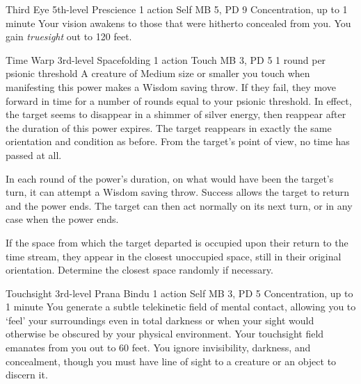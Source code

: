 \DndPowerHeader%
  {Third Eye}
  {5th-level Prescience}
  {1 action}
  {Self}
  {MB 5, PD 9}
  {Concentration, up to 1 minute}
Your vision awakens to those that were hitherto
concealed from you.
You gain \emph{truesight} out to 120 feet.

\DndPowerHeader%
  {Time Warp}
  {3rd-level Spacefolding}
  {1 action}
  {Touch}
  {MB 3, PD 5}
  {1 round per psionic threshold}
  A creature of Medium size or smaller
  you touch when manifesting this power makes a Wisdom saving throw.
  If they fail, they move forward in time for a number of rounds
  equal to your psionic threshold.
  In effect, the target seems to disappear in a shimmer
  of silver energy,
  then reappear after the duration of this power expires.
  The target reappears in exactly the same
  orientation and condition as before.
  From the target's point of view,
  no time has passed at all.

  In each round of the power's duration,
  on what would have been the target's turn,
  it can attempt a Wisdom saving throw.
  Success allows the target to return and the power ends.
  The target can then act normally on its next turn,
  or in any case when the power ends.
  
  If the space from which the target departed is occupied
  upon their return to the time stream,
  they appear in the closest unoccupied space,
  still in their original orientation.
  Determine the closest space randomly if necessary.

\DndPowerHeader%
  {Touchsight}
  {3rd-level Prana Bindu}
  {1 action}
  {Self}
  {MB 3, PD 5}
  {Concentration, up to 1 minute}
  You generate a subtle telekinetic field of mental contact,
  allowing you to `feel' your surroundings even in total darkness
  or when your sight would otherwise be obscured
  by your physical environment.
  Your touchsight field emanates from you out to 60 feet.
  You ignore invisibility, darkness, and concealment,
  though you must have line of sight to a creature or an object
  to discern it.
  
